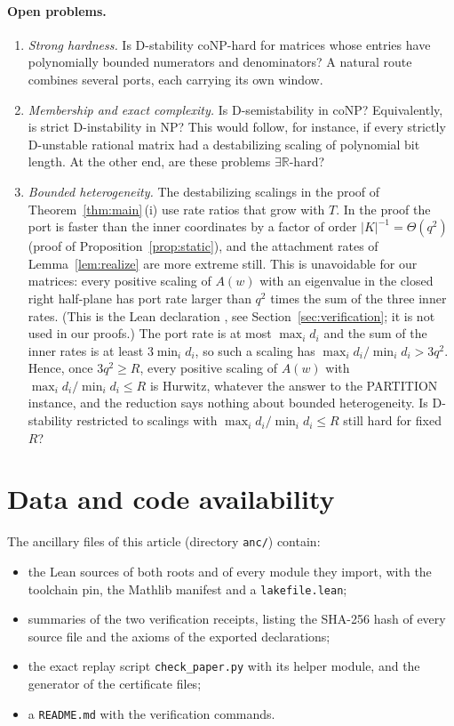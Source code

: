 \documentclass[11pt,a4paper]{article}
\theoremstyle{plain}
\theoremstyle{definition}
\theoremstyle{remark}
\newcommand{\R}{\mathbb{R}}
\begin{document}
\paragraph{Open problems.}
\begin{enumerate}[leftmargin=1.6em]
\item \emph{Strong hardness.} Is D-stability coNP-hard for matrices whose entries have
polynomially bounded numerators and denominators? A natural route combines several ports,
each carrying its own window.
\item \emph{Membership and exact complexity.} Is D-semistability in coNP? Equivalently, is
strict D-instability in NP? This would follow, for instance, if every strictly D-unstable
rational matrix had a destabilizing scaling of polynomial bit length. At the other end,
are these problems $\exists\R$-hard?
\item \emph{Bounded heterogeneity.} The destabilizing scalings in the proof of
Theorem~\ref{thm:main}\,(i) use rate ratios that grow with $T$. In the proof the port is
faster than the inner coordinates by a factor of order $|K|^{-1}=\Theta(q^2)$ (proof of
Proposition~\ref{prop:static}), and the attachment rates of Lemma~\ref{lem:realize} are
more extreme still. This is unavoidable for our matrices: every positive scaling of
$A(w)$ with an eigenvalue in the closed right half-plane has port rate larger than $q^2$
times the sum of the three inner rates. (This is the Lean declaration
, see Section~\ref{sec:verification}; it is not used in our
proofs.) The port rate is at most $\max_id_i$ and the sum of the inner rates is at least
$3\min_id_i$, so such a scaling has $\max_id_i/\min_id_i>3q^2$. Hence, once $3q^2\ge R$,
every positive scaling of $A(w)$ with $\max_id_i/\min_id_i\le R$ is Hurwitz, whatever the
answer to the PARTITION instance, and the reduction says nothing about bounded
heterogeneity. Is D-stability restricted to scalings with $\max_id_i/\min_id_i\le R$
still hard for fixed $R$?
\end{enumerate}

\section*{Data and code availability}
The ancillary files of this article (directory \texttt{anc/}) contain:
\begin{itemize}
\item the Lean sources of both roots and of every module they import, with the toolchain
pin, the Mathlib manifest and a \texttt{lakefile.lean};
\item summaries of the two verification receipts, listing the SHA-256 hash of every source
file and the axioms of the exported declarations;
\item the exact replay script \texttt{check\_paper.py} with its helper module, and the
generator of the certificate files;
\item a \texttt{README.md} with the verification commands.
\end{itemize}



\end{document}
